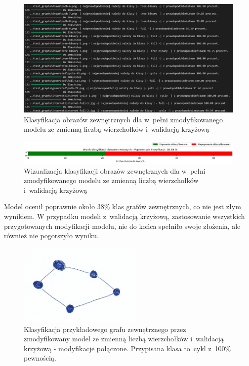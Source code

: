 \begin{figure}[ht]
	\centering
	\includegraphics[width=15.5cm]{resources/tests/images/v4/multiple_edges_crossvalid_txt.png}
	\caption{Klasyfikacja obrazów zewnętrznych dla w~pełni zmodyfikowanego modelu ze zmienną liczbą wierzchołków i~walidacją krzyżową}
	\label{Fig:tests-csvar-2b}
\end{figure}
\FloatBarrier

\begin{figure}[ht]
	\centering
	\includegraphics[width=15.5cm]{resources/tests/images/v4/multiple_edges_crossvalid_bar.png}
	\caption{Wizualizacja klasyfikacji obrazów zewnętrznych dla w~pełni zmodyfikowanego modelu ze zmienną liczbą wierzchołków i~walidacją krzyżową}
	\label{Fig:tests-csvar-2c}
\end{figure}
\FloatBarrier

Model ocenił poprawnie około 38\% klas grafów zewnętrznych, co nie jest złym wynikiem.
W przypadku modeli z~walidacją krzyżową, zastosowanie wszystkich przygotowanych modyfikacji modelu,
nie do końca spełniło swoje złożenia, ale również nie pogorszyło wyniku.

\begin{figure}[ht]
	\centering
	\includegraphics[height=4cm]{../graph_classification/test_graphs/drawn/cycle-2.png}
	\caption{Klasyfikacja przykładowego grafu zewnętrznego przez zmodyfikowany model
		ze zmienną liczbą wierzchołków i~walidacją krzyżową - modyfikacje połączone.
		Przypisana klasa to~cykl z~100\% pewnością.}
	\label{Fig:tests-cv-2d}
\end{figure}
\FloatBarrier